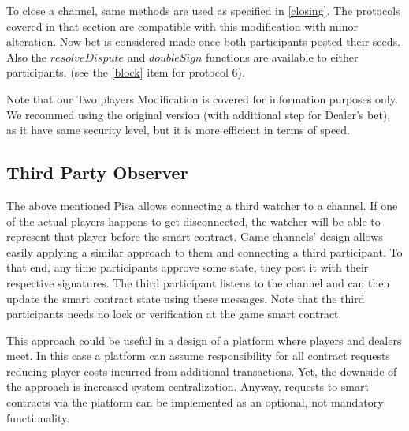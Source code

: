 To close a channel, same methods are used as specified in \autoref{closing}. The protocols covered in that section are compatible with this modification with minor alteration. Now bet is considered made once both participants posted their seeds. Also the  $resolveDispute$ and $doubleSign$ functions are available to either participants. (see the \ref{block} item for protocol 6). 

Note that our Two players Modification is covered for information purposes only. We recommed using the original version (with additional step for Dealer's bet), as it have same security level, but it is more efficient in terms of speed.

\subsection{Third Party Observer}

The above mentioned Pisa \cite{bib9} allows connecting a third watcher to a channel. If one of the actual players happens to get disconnected, the watcher will be able to represent that player before the smart contract. Game channels’ design allows easily applying a similar approach to them and connecting a third participant. To that end, any time participants approve some state, they post it with their respective signatures. The third participant listens to the channel and can then update the smart contract state using these messages. Note that the third participants needs no lock or verification at the game smart contract. 

This approach could be useful in a design of a platform where players and dealers meet. In this case a platform can assume responsibility for all contract requests reducing player costs incurred from additional transactions. Yet, the downside of the approach is increased system centralization. Anyway, requests to smart contracts via the platform can be implemented as an optional, not mandatory functionality.

